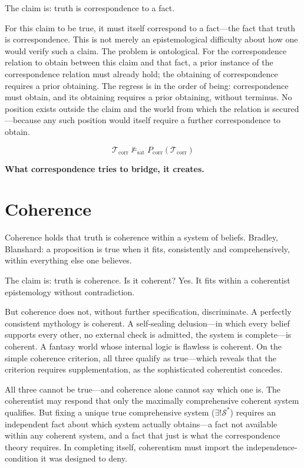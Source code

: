 \documentclass[11pt, oneside]{article}
\newcommand{\verdict}[1]{%
    \vspace{10pt}%
    \begin{center}\textcolor{LogosGold}{\textbf{#1}}\end{center}%
    \vspace{10pt}%
}
\begin{document}
The claim is: truth is correspondence to a fact.

For this claim to be true, it must itself correspond to a fact---the
fact that truth is correspondence. This is not merely an epistemological
difficulty about how one would verify such a claim. The problem is
ontological. For the correspondence relation to obtain between this claim
and that fact, a prior instance of the correspondence relation must
already hold; the obtaining of correspondence requires a prior obtaining.
The regress is in the order of being: correspondence must obtain, and
its obtaining requires a prior obtaining, without terminus. No position exists outside the claim and the world from which the
relation is secured---because any such position would itself require a
further correspondence to obtain.

\[
\mathcal{T}_{\mathrm{corr}} \not\models_{\mathrm{sat}}
P_{\mathrm{corr}}(\mathcal{T}_{\mathrm{corr}}) \tag{AC}
\]

\verdict{What correspondence tries to bridge, it creates.}

\section{Coherence}

Coherence holds that truth is coherence within a system of beliefs.
Bradley, Blanshard: a proposition is true when it fits, consistently and
comprehensively, within everything else one believes.

The claim is: truth is coherence. Is it coherent? Yes. It fits within a
coherentist epistemology without contradiction.

But coherence does not, without further specification, discriminate. A
perfectly consistent mythology is coherent. A self-sealing
delusion---in which every belief supports every other, no external check
is admitted, the system is complete---is coherent. A fantasy world whose
internal logic is flawless is coherent. On the simple coherence
criterion, all three qualify as true---which reveals that the criterion
requires supplementation, as the sophisticated coherentist concedes.

All three cannot be true---and coherence alone cannot say which one is.
The coherentist may respond that only the maximally comprehensive
coherent system qualifies. But fixing a unique true comprehensive system
($\exists!\mathcal{S}^{*}$) requires an independent fact
about which system actually obtains---a fact not available within any
coherent system, and a fact that just is what the correspondence theory
requires. In completing itself, coherentism must import the
independence-condition it was designed to deny.
\end{document}
